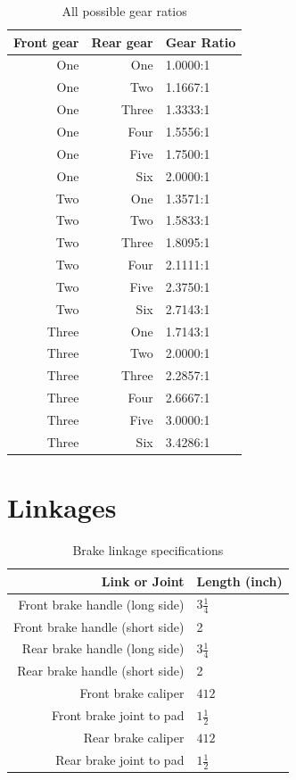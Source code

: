 \documentclass[11pt]{article}
\begin{document}
\begin{table}[H]
	\centering
	\begin{tabular}{|r|r|l|}
		\hline
		\textbf{Front gear} & \textbf{Rear gear} & \textbf{Gear Ratio} \\
		\hline
		One & One & 1.0000:1 \\
		One & Two & 1.1667:1 \\
		One & Three & 1.3333:1 \\
		One & Four & 1.5556:1 \\
		One & Five & 1.7500:1 \\
		One & Six & 2.0000:1 \\
		\hline
		Two & One & 1.3571:1 \\
		Two & Two & 1.5833:1 \\
		Two & Three & 1.8095:1 \\
		Two & Four & 2.1111:1 \\
		Two & Five & 2.3750:1 \\
		Two & Six & 2.7143:1 \\
		\hline
		Three & One & 1.7143:1 \\
		Three & Two & 2.0000:1 \\
		Three & Three & 2.2857:1 \\
		Three & Four & 2.6667:1 \\
		Three & Five & 3.0000:1 \\
		Three & Six & 3.4286:1 \\
		\hline
	\end{tabular}
	\caption{All possible gear ratios}
\end{table}

\section*{Linkages}
\begin{table}[H]
	\centering
	\begin{tabular}{|r|l|}
		\hline
		\textbf{Link or Joint} & \textbf{Length (inch)} \\
		\hline
		Front brake handle (long side) & \(3\frac{1}{4}\) \\
		\hline
		Front brake handle (short side) & 2 \\
		\hline
		Rear brake handle (long side) & \(3\frac{1}{4}\) \\
		\hline
		Rear brake handle (short side) & 2 \\
		\hline
		Front brake caliper & \(4{1}{2}\) \\
		\hline
		Front brake joint to pad & \(1\frac{1}{2}\) \\
		\hline
		Rear brake caliper & \(4{1}{2}\) \\
		\hline
		Rear brake joint to pad & \(1\frac{1}{2}\) \\
		\hline
	\end{tabular}
	\caption{Brake linkage specifications}
\end{table}
\end{document}
